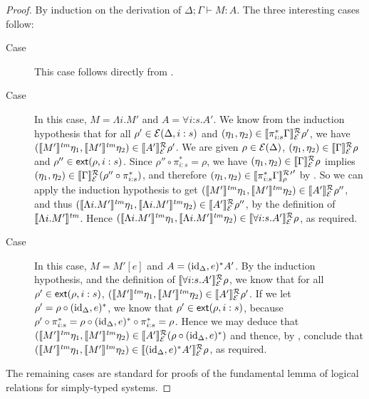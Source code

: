 \begin{proof}
  By induction on the derivation of $\Delta; \Gamma \vdash M : A$. The
  three interesting cases follow:
  \begin{description}
  \item[Case ] This case follows directly from
    .
  \item[Case ] In this case, $M = \Lambda i.M'$ and
    $A = \forall i\mathord:s. A'$. We know from the induction
    hypothesis that for all $\rho' \in \mathcal{E}(\Delta, i:s)$ and
    $(\eta_1,\eta_2) \in \llbracket \pi_{i:s}^*\Gamma \rrbracket^{\mathcal{R}}_{\mathcal{E}}{\rho}'$,
    we have $(\llbracket M' \rrbracket^{\mathit{tm}}\eta_1,\llbracket M' \rrbracket^{\mathit{tm}}\eta_2) \in
    \llbracket A' \rrbracket^{\mathcal{R}}_{\mathcal{E}}{\rho}'$. We are given $\rho \in
    \mathcal{E}(\Delta)$, $(\eta_1,\eta_2) \in
    \llbracket \Gamma \rrbracket^{\mathcal{R}}_{\mathcal{E}}{\rho}$ and $\rho'' \in
    \mathsf{ext}(\rho,i:s)$. Since $\rho'' \circ \pi^*_{i:s} = \rho$, we
    have $(\eta_1,\eta_2) \in \llbracket \Gamma \rrbracket^{\mathcal{R}}_{\mathcal{E}}{\rho}$ implies
    $(\eta_1,\eta_2) \in \llbracket \Gamma \rrbracket^{\mathcal{R}}_{\mathcal{E}}{(\rho'' \circ
      \pi^*_{i:s})}$, and therefore $(\eta_1,\eta_2) \in
    \llbracket \pi_{i:s}^*\Gamma \rrbracket^{\mathcal{R}}_{\rho}{'}'$ by . So we
    can apply the induction hypothesis to get $(\llbracket M' \rrbracket^{\mathit{tm}}\eta_1,
    \llbracket M' \rrbracket^{\mathit{tm}}\eta_2) \in \llbracket A' \rrbracket^{\mathcal{R}}_{\mathcal{E}}{\rho}''$, and thus
    $(\llbracket \Lambda i.M' \rrbracket^{\mathit{tm}}\eta_1,\llbracket \Lambda i.M' \rrbracket^{\mathit{tm}}\eta_2) \in
    \llbracket A' \rrbracket^{\mathcal{R}}_{\mathcal{E}}{\rho}''$, by the definition of $\llbracket \Lambda
      i. M' \rrbracket^{\mathit{tm}}$. Hence $(\llbracket \Lambda i.M' \rrbracket^{\mathit{tm}}\eta_1,\llbracket \Lambda
      i.M' \rrbracket^{\mathit{tm}}\eta_2) \in \llbracket \forall
      i\mathord:s. A' \rrbracket^{\mathcal{R}}_{\mathcal{E}}{\rho}$, as required.
  \item[Case ] In this case, $M = M'[e]$ and $A =
    (\mathrm{id}_\Delta, e)^*A'$. By the induction hypothesis, and the
    definition of $\llbracket \forall i\mathord:s.A' \rrbracket^{\mathcal{R}}_{\mathcal{E}}{\rho}$, we
    know that for all $\rho' \in \mathsf{ext}(\rho,i:s)$,
    $(\llbracket M' \rrbracket^{\mathit{tm}}\eta_1, \llbracket M' \rrbracket^{\mathit{tm}}\eta_2) \in
    \llbracket A' \rrbracket^{\mathcal{R}}_{\mathcal{E}}{\rho}'$. If we let $\rho' = \rho \circ
    (\mathrm{id}_\Delta, e)^*$, we know that $\rho' \in \mathsf{ext}(\rho,i:s)$,
    because $\rho' \circ \pi^*_{i:s} = \rho \circ (\mathrm{id}_\Delta, e)^*
    \circ \pi^*_{i:s} = \rho$. Hence we may deduce that
    $(\llbracket M' \rrbracket^{\mathit{tm}}\eta_1,\llbracket M' \rrbracket^{\mathit{tm}}\eta_2) \in
    \llbracket A' \rrbracket^{\mathcal{R}}_{\mathcal{E}}{(\rho \circ (\mathrm{id}_\Delta,e)^*)}$ and thence,
    by , conclude that $(\llbracket M' \rrbracket^{\mathit{tm}}\eta_1,
    \llbracket M' \rrbracket^{\mathit{tm}}\eta_2) \in \llbracket (\mathrm{id}_\Delta,e)^*A' \rrbracket^{\mathcal{R}}_{\mathcal{E}}{\rho}$,
    as required.
  \end{description}
  The remaining cases are standard for proofs of the fundamental lemma
  of logical relations for simply-typed systems.
\end{proof}
